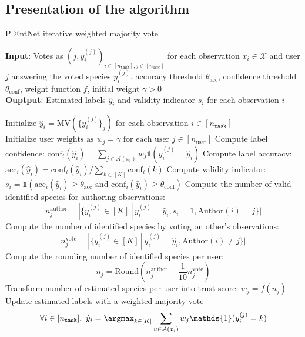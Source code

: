 \subsection{Presentation of the algorithm}
\label{sub:algo_plantnet}

\begin{algorithm}[h]
        \caption{Pl@ntNet iterative weighted majority vote}
        \label{alg:plantnet_algorithm}
        \textbf{Input}: Votes as $(j, y_i^{(j)})_{i\in [n_{\texttt{task}}],j\in [n_\text{user}]}$ for each observation $x_i\in\mathcal{X}$ and user $j$ answering the voted species $y_i^{(j)}$, accuracy threshold $\theta_{\text{acc}}$, confidence threshold $\theta_{\text{conf}}$, weight function $f$, initial weight $\gamma>0$ \\
        \textbf{Ouptput}: Estimated labels $\hat y_i$ and validity indicator $s_i$ for each observation $i$
        \begin{algorithmic}[1]
            \STATE $\text{Initialize } \hat y_i = \mathrm{MV}\left(\{y_i^{(j)}\}_j\right) \text{ for each observation } i \in [n_{\texttt{task}}]$
            \STATE $\text{Initialize user weights as } w_j = \gamma \text{ for each user } j \in [n_\text{user}]$
                    \STATE Compute label confidence: $\mathrm{conf}_i(\hat y_i) = \sum_{j\in \mathcal{A}(x_i)} w_j \mathds{1}(y_i^{(j)}=\hat y_i)$
                    \STATE Compute label accuracy: $\mathrm{acc}_i(\hat y_i) = \mathrm{conf}_i(\hat y_i) / \sum_{k\in [K]} \mathrm{conf}_i(k)$
                    \STATE Compute validity indicator: $s_i = \mathds{1}( \mathrm{acc}_i(\hat y_i) \geq \theta_{\text{acc}} \text{ and } \mathrm{conf}_i(\hat y_i) \geq \theta_{\text{conf}})$
                \ENDFOR
                    \STATE Compute the number of valid identified species for authoring observations: \[n_j^\text{author} = |\{y_i^{(j)}\in [K] \,|\, y_i^{(j)}=\hat y_i, s_i=1, \mathrm{Author}(i)=j\}|\]
                    \STATE Compute the number of identified species by voting on other's observations: \[n_j^\text{vote}=|\{y_i^{(j)}\in [K]\,|\, y_i^{(j)}=\hat y_i, \mathrm{Author}(i)\neq j\}|\]
                    \STATE Compute the rounding number of identified species per user: \[n_j = \mathrm{Round}\left(n_j^\text{author} + \frac{1}{10}n_j^\text{vote}\right)\]
                    \STATE Transform number of estimated species per user into trust score: $w_j = f(n_j)$
                    \ENDFOR
                \STATE Update estimated labels with a weighted majority vote $$ \forall i \in [n_{\texttt{task}}],\ \hat y_i = \argmax_{k\in[K]} \sum_{u\in \mathcal{A}(x_i)} w_j\mathds{1}(y_i^{(j)}=k)$$
            \ENDWHILE
        \end{algorithmic}
    \end{algorithm}

